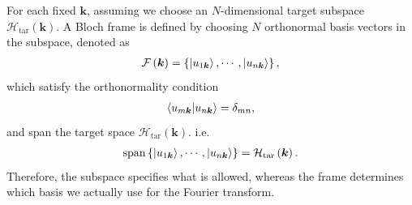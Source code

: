 \documentclass[12pt, oneside]{article}
\newcommand{\mr}[1]{\mathrm{#1}}
\newcommand{\p}[1]{\left(#1\right)}
\newcommand{\br}[1]{\left\{#1\right\}}
\numberwithin{equation}{subsection}
\begin{document}
For each fixed \(\bm{k}\), assuming we choose an \(N\)-dimensional target subspace \(\mathcal{H}_\mr{tar} \p{\bm{k}}\). A Bloch frame is defined by choosing \(N\) orthonormal basis vectors in the subspace, denoted as 
\begin{align}
	\mathcal{F}\p{\bm{k}} = \br{\ket{u_{1 \bm{k}}}, \cdots, \ket{u_{n \bm{k}}}},
\end{align}
which satisfy the orthonormality condition
\begin{align}
	\braket{u_{m \bm{k}} | u_{n \bm{k}} } = \delta_{mn},
\end{align}
and span the target space \(\mathcal{H}_\mr{tar} \p{\bm{k}}\). i.e.
\begin{align}
	\mr{span} \br{\ket{u_{1 \bm{k}}}, \cdots, \ket{u_{n \bm{k}}}} = \mathcal{H}_\mr{tar} \p{\bm{k}}.
\end{align}
Therefore, the subspace specifies what is allowed, whereas the frame determines which basis we actually use for the Fourier transform.
\end{document}
